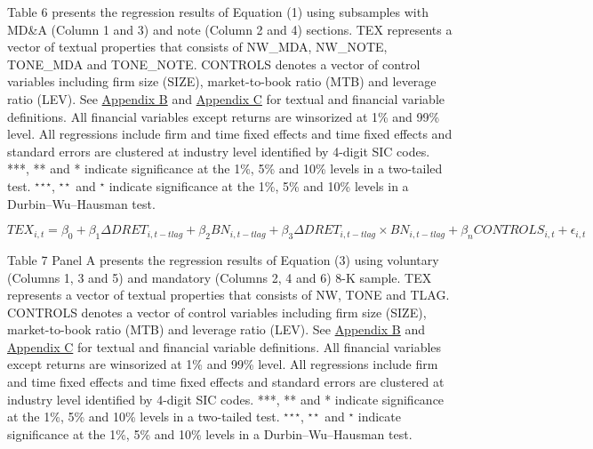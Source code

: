 Table 6 presents the regression results of Equation (1) using subsamples with MD\&A (Column 1 and 3) and note (Column 2 and 4) sections. TEX represents a vector of textual properties that consists of NW\_MDA, NW\_NOTE, TONE\_MDA and TONE\_NOTE. CONTROLS denotes a vector of control variables including firm size (SIZE), market-to-book ratio (MTB) and leverage ratio (LEV). See \hyperref[appb]{Appendix B} and \hyperref[appc]{Appendix C} for textual and financial variable definitions. All financial variables except returns are winsorized at 1\% and 99\% level. All regressions include firm and time fixed effects and time fixed effects and standard errors are clustered at industry level identified by 4-digit SIC codes. ***, ** and * indicate significance at the 1\%, 5\% and 10\% levels in a two-tailed test. $^{\star\star\star}$, $^{\star\star}$ and $^{\star}$ indicate significance at the 1\%, 5\% and 10\% levels in a Durbin–Wu–Hausman test.

\newpage

\setcounter{equation}{2}
\begin{equation}
	TEX_{i,t}=\beta_0+\beta_1\Delta DRET_{i,t-tlag}+\beta_2BN_{i,t-tlag}+\beta_3\Delta DRET_{i,t-tlag}\times BN_{i,t-tlag}+\beta_nCONTROLS_{i,t}+\epsilon_{i,t}
\end{equation}

Table 7 Panel A presents the regression results of Equation (3) using voluntary (Columns 1, 3 and 5) and mandatory (Columns 2, 4 and 6) 8-K sample. TEX represents a vector of textual properties that consists of NW, TONE and TLAG. CONTROLS denotes a vector of control variables including firm size (SIZE), market-to-book ratio (MTB) and leverage ratio (LEV). See \hyperref[appb]{Appendix B} and \hyperref[appc]{Appendix C} for textual and financial variable definitions. All financial variables except returns are winsorized at 1\% and 99\% level. All regressions include firm and time fixed effects and time fixed effects and standard errors are clustered at industry level identified by 4-digit SIC codes. ***, ** and * indicate significance at the 1\%, 5\% and 10\% levels in a two-tailed test. $^{\star\star\star}$, $^{\star\star}$ and $^{\star}$ indicate significance at the 1\%, 5\% and 10\% levels in a Durbin–Wu–Hausman test.

\newpage


